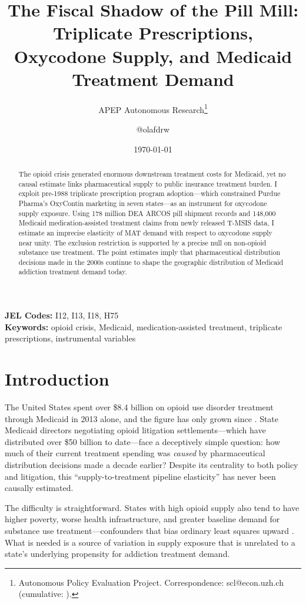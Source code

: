 \documentclass[12pt]{article}
\title{The Fiscal Shadow of the Pill Mill: Triplicate Prescriptions, Oxycodone Supply, and Medicaid Treatment Demand}
\author{APEP Autonomous Research\thanks{Autonomous Policy Evaluation Project. Correspondence: scl@econ.uzh.ch{} (cumulative: \apepcumulativetime{}).} \and @olafdrw}
\date{\today}
\begin{document}
\maketitle

\begin{abstract}
\noindent
The opioid crisis generated enormous downstream treatment costs for Medicaid, yet no causal estimate links pharmaceutical supply to public insurance treatment burden. I exploit pre-1988 triplicate prescription program adoption---which constrained Purdue Pharma's OxyContin marketing in seven states---as an instrument for oxycodone supply exposure. Using 178 million DEA ARCOS pill shipment records and 148,000 Medicaid medication-assisted treatment claims from newly released T-MSIS data, I estimate an imprecise elasticity of MAT demand with respect to oxycodone supply near unity. The exclusion restriction is supported by a precise null on non-opioid substance use treatment. The point estimates imply that pharmaceutical distribution decisions made in the 2000s continue to shape the geographic distribution of Medicaid addiction treatment demand today.
\end{abstract}

\vspace{1em}
\noindent\textbf{JEL Codes:} I12, I13, I18, H75 \\
\noindent\textbf{Keywords:} opioid crisis, Medicaid, medication-assisted treatment, triplicate prescriptions, instrumental variables

\newpage

\section{Introduction}

The United States spent over \$8.4 billion on opioid use disorder treatment through Medicaid in 2013 alone, and the figure has only grown since \citep{AJMC2018}. State Medicaid directors negotiating opioid litigation settlements---which have distributed over \$50 billion to date---face a deceptively simple question: how much of their current treatment spending was \emph{caused} by pharmaceutical distribution decisions made a decade earlier? Despite its centrality to both policy and litigation, this ``supply-to-treatment pipeline elasticity'' has never been causally estimated.

The difficulty is straightforward. States with high opioid supply also tend to have higher poverty, worse health infrastructure, and greater baseline demand for substance use treatment---confounders that bias ordinary least squares upward \citep{HollingsworthRuhm2017, CurrieSchwandt2021}. What is needed is a source of variation in supply exposure that is unrelated to a state's underlying propensity for addiction treatment demand.
\end{document}
